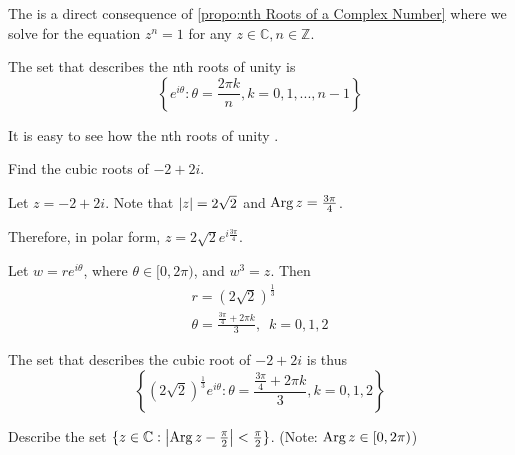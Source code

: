 \documentclass[notoc,notitlepage]{tufte-book}
\begin{document}
\begin{remark}\label{remark:nth Roots of Unity}
	The  is a direct consequence of \cref{propo:nth Roots of a Complex Number} where we solve for the equation $z^n = 1$ for any $z \in \mathbb{C}, n \in \mathbb{Z}$.

	The set that describes the nth roots of unity is
	\begin{equation}\label{eq:nth roots of unity}
		\left\{ e^{i \theta} : \theta = \frac{2 \pi k}{n}, k = 0, 1, ..., n - 1 \right\}
	\end{equation}
\end{remark}

It is easy to see how the nth roots of unity .

\begin{eg}
	Find the cubic roots of $-2 + 2i$.

	Let $z = -2 + 2i$. Note that $\left|z\right| = 2\sqrt{2}$ and $\operatorname{Arg} z = \frac{3 \pi }{4}$.

	Therefore, in polar form, $z = 2 \sqrt{2} e^{i \frac{3\pi}{4} }$.

	Let $w = re^{i \theta}$, where $\theta \in [0, 2\pi)$, and $w^3 = z$. Then
	\begin{gather*}
		r = (2 \sqrt{2})^\frac{1}{3} \\
		\theta = \frac{\frac{3\pi}{4} + 2 \pi k}{3}, \enspace k = 0, 1, 2
	\end{gather*}

	The set that describes the cubic root of $-2 + 2i$ is thus
	\begin{equation*}
		\left\{ (2\sqrt{2})^\frac{1}{3} e^{i \theta} : \theta = \frac{\frac{3\pi}{4} + 2 \pi k}{3}, k = 0, 1, 2 \right\}
	\end{equation*}
\end{eg}

\begin{eg}
	Describe the set $\{z \in \mathbb{C} : \left|\operatorname{Arg} z - \frac{\pi}{2}\right| < \frac{\pi}{2} \}$. (Note: $\operatorname{Arg} z \in [0, 2\pi)$)

	\begin{center}
	\end{center}
\end{eg}
\end{document}
